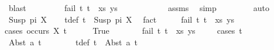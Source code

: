\begin{isabellebody}
\ blast\isanewline
\ \ \ \ \ \ \ \isamarkupfalse%
\ {\isachardoublequoteopen}fail\ {\isacharparenleft}{\kern0pt}{\isacharparenleft}{\kern0pt}t{}{\isacharcomma}{\kern0pt}\ t{}{\isacharparenright}{\kern0pt}\ {\isacharhash}{\kern0pt}\ xs{\isacharcomma}{\kern0pt}\ ys{\isacharparenright}{\kern0pt}{\isachardoublequoteclose}\ \isanewline
\ \ \ \ \ \ \ \ \ \isamarkupfalse%
\ assms\ \isamarkupfalse%
\ simp\isanewline
\ \ \ \ \isamarkupfalse%
\isanewline
\ \ \isamarkupfalse%
\ {\isacharparenleft}{\kern0pt}auto{\isacharparenright}{\kern0pt}\isanewline
{}\isamarkupfalse%
\isanewline
\ \ \isamarkupfalse%
\ {\isacharparenleft}{\kern0pt}Susp\ pi\ X{\isacharparenright}{\kern0pt}\isanewline
\ \ \isamarkupfalse%
\ t{}{\isacharunderscore}{\kern0pt}def{\isacharcolon}{\kern0pt}\ {\isachardoublequoteopen}t{}\ {\isacharequal}{\kern0pt}\ Susp\ pi\ X{\isachardoublequoteclose}\ \isamarkupfalse%
\ fact\isanewline
\ \ \isamarkupfalse%
\ \isamarkupfalse%
\ {\isachardoublequoteopen}fail\ {\isacharparenleft}{\kern0pt}{\isacharparenleft}{\kern0pt}t{}{\isacharcomma}{\kern0pt}\ t{}{\isacharparenright}{\kern0pt}\ {\isacharhash}{\kern0pt}\ xs{\isacharcomma}{\kern0pt}\ ys{\isacharparenright}{\kern0pt}{\isachardoublequoteclose}\isanewline
\ \ \isamarkupfalse%
{\isacharparenleft}{\kern0pt}cases\ {\isachardoublequoteopen}occurs\ X\ t{}{\isachardoublequoteclose}{\isacharparenright}{\kern0pt}\isanewline
\ \ \ \ \isamarkupfalse%
\ True\isanewline
\ \ \ \ \isamarkupfalse%
\ \isamarkupfalse%
\ {\isachardoublequoteopen}fail\ {\isacharparenleft}{\kern0pt}{\isacharparenleft}{\kern0pt}t{}{\isacharcomma}{\kern0pt}\ t{}{\isacharparenright}{\kern0pt}\ {\isacharhash}{\kern0pt}\ xs{\isacharcomma}{\kern0pt}\ ys{\isacharparenright}{\kern0pt}{\isachardoublequoteclose}\isanewline
\ \ \ \ \isamarkupfalse%
{\isacharparenleft}{\kern0pt}cases\ t{}{\isacharparenright}{\kern0pt}\isanewline
\ \ \ \ \ \ \isamarkupfalse%
\ {\isacharparenleft}{\kern0pt}Abst\ a\ t{}{\isacharprime}{\kern0pt}{\isacharparenright}{\kern0pt}\isanewline
\ \ \ \ \ \ \isamarkupfalse%
\ t{}{\isacharunderscore}{\kern0pt}def{\isacharcolon}{\kern0pt}\ {\isachardoublequoteopen}t{}\ {\isacharequal}{\kern0pt}\ Abst\ a\ t{}{\isacharprime}{\kern0pt}{\isachardoublequoteclose}\ \isamarkupfalse%

\end{isabellebody}
